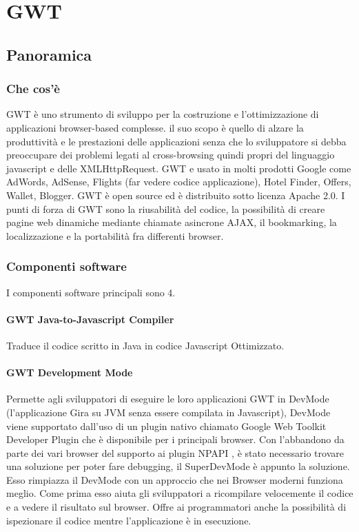 
\chapter[GWT]{GWT\cite{GWT}}


\setcounter{secnumdepth}{5}
\setcounter{tocdepth}{5}

\section{Panoramica}
	  \subsection{Che cos'è}
	\gls{GWT} è uno strumento di sviluppo per la costruzione e l'ottimizzazione di applicazioni browser-based complesse. il suo scopo è quello di alzare la produttività e le prestazioni delle applicazioni senza che lo sviluppatore
	si debba preoccupare dei problemi legati al cross-browsing quindi propri del linguaggio javascript e delle XMLHttpRequest.
	GWT e usato in molti prodotti Google come AdWords, AdSense, Flights (far vedere codice applicazione), Hotel Finder, Offers, Wallet, Blogger.
	GWT è open source ed è distribuito sotto licenza Apache 2.0.
	I punti di forza di GWT sono la riusabilità del codice, la possibilità di 
	creare pagine web dinamiche mediante chiamate asincrone AJAX, il bookmarking, la localizzazione e la portabilità fra differenti browser.
	\newpage
	  \subsection{Componenti software}
	    I componenti software principali sono 4.
		\subsubsection{GWT Java-to-Javascript Compiler}
		Traduce il codice scritto in Java in codice Javascript Ottimizzato.
		\subsubsection{GWT Development Mode}
		Permette agli sviluppatori di eseguire le loro applicazioni GWT in \gls{DevMode} (l'applicazione Gira su JVM
		senza essere compilata in Javascript), \gls{DevMode} viene supportato dall'uso di un plugin nativo
		chiamato Google Web Toolkit Developer Plugin che è disponibile per i principali browser.
		Con l'abbandono da parte dei vari browser del supporto ai plugin \gls{NPAPI} 
		\cite{NPAPI}, è stato necessario trovare una soluzione per poter fare debugging,
		il SuperDevMode è appunto la soluzione. Esso rimpiazza il \gls{DevMode} con un approccio che nei Browser moderni 
		funziona meglio. Come prima esso aiuta gli sviluppatori a ricompilare velocemente il codice e a 
		vedere il risultato sul browser. Offre ai programmatori anche la possibilità di ispezionare
		il codice mentre l'applicazione è in esecuzione.
